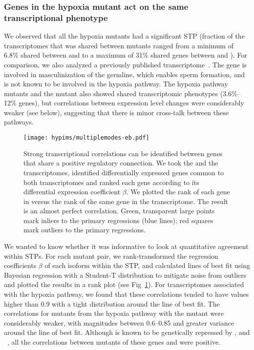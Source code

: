 \subsubsection*{Genes in the hypoxia mutant act on the same transcriptional phenotype}
\label{sec:phenotypes}
We observed that all the hypoxia mutants had a significant STP (fraction of the
transcriptomes that was shared between mutants
ranged from a minimum of 6.8\% shared between \hif{} and \eglvhl{} to a maximum
of 31\% shared genes between \egl{} and \eglvhl{}). For comparison, we also
analyzed a previously published \fog{} transcriptome~\citep{Angeles-Albores2016a}.
The  gene is involved in masculinization of the \cel{} germline,
which enables sperm formation, and is not known to be involved in the hypoxia
pathway. The hypoxia pathway mutants and the \fog{} mutant also showed shared
transcriptomic phenotypes (3.6\%--12\% genes), but correlations between
expression level changes were considerably weaker (see below), suggesting that
there is minor cross-talk between these pathways.


\begin{figure}[tbhp]
\centering
\texttt{[image: hypims/multiplemodes-eb.pdf]}
\caption{
Strong transcriptional correlations can be identified between genes
that share a positive regulatory connection. We took the \egl{} and the \rhy{}
transcriptomes, identified differentially expressed genes common to both
transcriptomes and ranked each gene according to its differential expression
coefficient $\beta$. We plotted the rank of each gene in \rhy{} versus the
rank of the same gene in the \egl{} transcriptome. The result is an almost
perfect correlation. Green, transparent large points mark inliers to the primary
regressions (blue lines); red squares mark outliers to the primary regressions.
}
\label{fig:genetic_interactions}
\end{figure}

We wanted to know whether it was informative to look at quantitative agreement
within STPs. For each mutant pair, we rank-transformed
the regression coefficients $\beta$ of each isoform within the STP, and
calculated lines of best fit using Bayesian regression with a Student-T
distribution to mitigate noise from outliers and plotted the results in a rank plot
(see Fig~\ref{fig:genetic_interactions}). For transcriptomes associated with the
hypoxia pathway, we found that these correlations tended to have
values higher than 0.9 with a tight distribution around the line of best fit.
The correlations for mutants from the hypoxia pathway
with the \fog{} mutant were considerably weaker, with magnitudes between
0.6--0.85 and greater variance around the line of best fit.
Although  is known to be genetically repressed by ,  and
~\citep{Epstein2001,Shen2006}, all the correlations
between mutants of these genes and \hif{} were positive.

